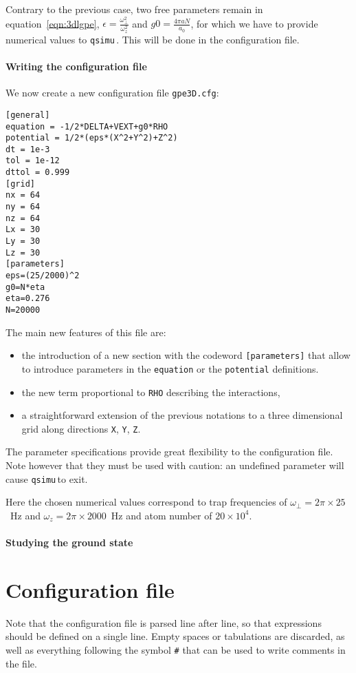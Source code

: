 \documentclass[12pt,a4paper]{report}
\newcommand{\qsimu}{\texttt{qsimu}\,}
\begin{document}
Contrary to the previous case, two free parameters remain in equation~\eqref{eqn:3dlgpe}, $\epsilon=\frac{\omega_\perp^2}{\omega_z^2}$ and $g0=\frac{4\pi aN}{a_0}$, for which we have to provide numerical values to \qsimu.
This will be done in the configuration file.

\subsubsection{Writing the configuration file}
We now create a new configuration file \texttt{gpe3D.cfg}:
\begin{verbatim}
[general]
equation = -1/2*DELTA+VEXT+g0*RHO
potential = 1/2*(eps*(X^2+Y^2)+Z^2)
dt = 1e-3
tol = 1e-12
dttol = 0.999
[grid]
nx = 64
ny = 64
nz = 64
Lx = 30
Ly = 30
Lz = 30
[parameters]
eps=(25/2000)^2
g0=N*eta
eta=0.276
N=20000
\end{verbatim}
The main new features of this file are:
\begin{itemize}
\item the introduction of a new section with the codeword \texttt{[parameters]} that allow to introduce parameters in the \texttt{equation} or the \texttt{potential} definitions.
\item the new term proportional to \texttt{RHO} describing the interactions,
\item a straightforward extension of the previous notations to a three dimensional grid along directions \texttt{X}, \texttt{Y}, \texttt{Z}.
\end{itemize}
The parameter specifications provide great flexibility to the configuration file.
Note however that they must be used with caution: an undefined parameter will cause \qsimu to exit.

Here the chosen numerical values correspond to trap frequencies of $\omega_\perp=2\pi\times25$~Hz and $\omega_z=2\pi\times2000$~Hz and atom number of $20\times10^4$.

\subsubsection{Studying the ground state}

\chapter{Configuration file}
Note that the configuration file is parsed line after line, so that expressions should be defined on a single line. Empty spaces or tabulations are discarded, as well as everything following the symbol \texttt{\#} that can be used to write comments in the file.
\end{document}

